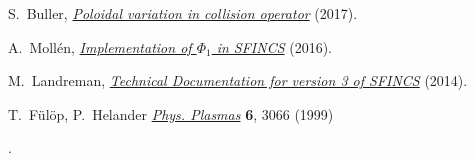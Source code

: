 \documentclass[12pt]{article}
\begin{document}
\begin{thebibliography}{99}

 S.~Buller, \href{https://github.com/landreman/sfincs/blob/poloidalVariationInCollisionOperator/doc/poloidal_variation_in_collision_operator_2017-09-08.pdf}{ \em Poloidal variation in collision operator} (2017).

 A.~Moll\'en, \href{https://github.com/landreman/sfincs/blob/master/doc/Phi1_implementation_2016-01.pdf}{ \em Implementation of $\Phi_1$ in SFINCS} (2016).


 M.~Landreman, \href{https://github.com/landreman/sfincs/blob/poloidalVariationInCollisionOperator/doc/20150507-01\%20Technical\%20documentation\%20for\%20version\%203\%20of\%20SFINCS.pdf}{\em Technical Documentation for version 3 of SFINCS} (2014).

 T.~F\"{u}l\"{o}p, P.~Helander \href{http://aip.scitation.org/doi/abs/10.1063/1.873593}{\em Phys. Plasmas}{ \bf 6}, 3066 (1999) %

.

  



\end{thebibliography}
\end{document}
